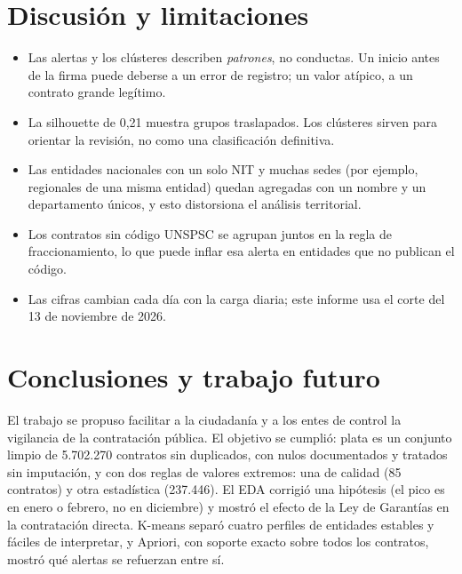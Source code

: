 \documentclass[conference,a4paper]{IEEEtran}
\begin{document}
\section{Discusión y limitaciones}
\begin{itemize}
  \item Las alertas y los clústeres describen \emph{patrones}, no conductas. Un inicio antes de la firma puede
        deberse a un error de registro; un valor atípico, a un contrato grande legítimo.
  \item La silhouette de 0,21 muestra grupos traslapados. Los clústeres sirven para orientar la revisión, no como
        una clasificación definitiva.
  \item Las entidades nacionales con un solo NIT y muchas sedes (por ejemplo, regionales de una misma entidad)
        quedan agregadas con un nombre y un departamento únicos, y esto distorsiona el análisis territorial.
  \item Los contratos sin código UNSPSC se agrupan juntos en la regla de fraccionamiento, lo que puede inflar esa
        alerta en entidades que no publican el código.
  \item Las cifras cambian cada día con la carga diaria; este informe usa el corte del 13 de noviembre de 2026.
\end{itemize}

\section{Conclusiones y trabajo futuro}
El trabajo se propuso facilitar a la ciudadanía y a los entes de control la vigilancia de la contratación pública. El objetivo se cumplió: plata es un conjunto limpio de 5.702.270 contratos sin duplicados, con nulos documentados y tratados sin
imputación, y con dos reglas de valores extremos: una de calidad (85 contratos) y otra estadística (237.446). El
EDA corrigió una hipótesis (el pico es en enero o febrero, no en diciembre) y mostró el efecto de la Ley de
Garantías en la contratación directa. K-means separó cuatro perfiles de entidades estables y fáciles de
interpretar, y Apriori, con soporte exacto sobre todos los contratos, mostró qué alertas se refuerzan entre sí.
\end{document}

